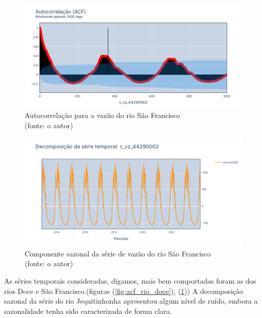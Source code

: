 \begin{figure}[!h]
	\centering
	\includegraphics[scale=0.33]{Figuras/rio_sao_francisco/acf_rio_sao_francisco.png}
	\caption{Autocorrelação para a vazão do rio São Francisco\\(fonte: o autor)}
	\label{fig:acf_rio_sao_francisco}
\end{figure}

\begin{figure}[!h]
	\centering
	\includegraphics[scale=0.33]{Figuras/rio_sao_francisco/sazonalidade_rio_sao_francisco.png}
	\caption{Componente sazonal da série de vazão do rio São Francisco\\(fonte: o autor)}
	\label{fig:sazonalidade_rio_sao_francisco}
\end{figure}

As séries temporais consideradas, digamos, mais bem comportadas foram as dos rios Doce e São Francisco.(figuras (\ref{fig:acf_rio_doce}), (\ref{fig:acf_rio_sao_francisco})) A decomposição sazonal da série do rio Jequitinhonha apresentou algum nível de ruído, embora a sazonalidade tenha sido caracterizada de forma clara.

%


